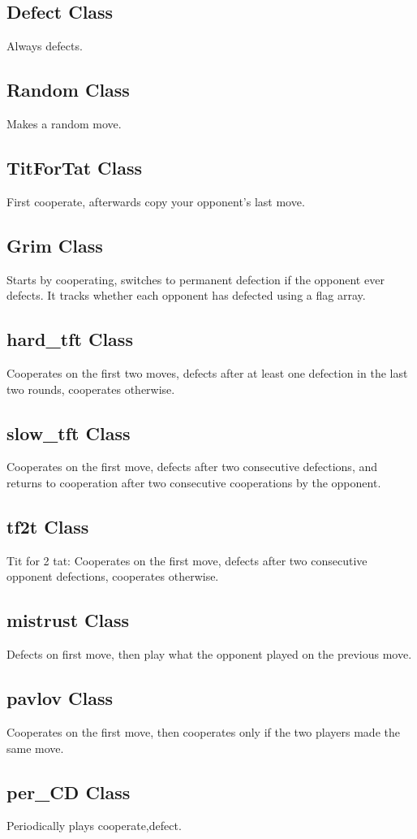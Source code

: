 \documentclass[12pt]{article}
\begin{document}
\subsection{Defect Class}
Always defects.
\subsection{Random Class}
Makes a random move.
\subsection{TitForTat Class}
First cooperate, afterwards copy your opponent's last move.
\subsection{Grim Class}
Starts by cooperating, switches to permanent defection if the opponent ever defects. It tracks whether each opponent has defected using a flag array.
\subsection{hard\_tft Class}
Cooperates on the first two moves, defects after at least one defection in the last two rounds,
cooperates otherwise.
\subsection{slow\_tft Class}
Cooperates on the first  move, defects after two consecutive defections,
and returns to cooperation after two consecutive cooperations by the opponent.
\subsection{tf2t Class}
Tit for 2 tat: Cooperates on the first move, defects after two consecutive opponent defections,
cooperates otherwise.
\subsection{mistrust Class}
Defects on first move, then play what the opponent played on the previous move.
\subsection{pavlov Class}
Cooperates on the first move, then cooperates only if the two players made the same move.
\subsection{per\_CD Class}
Periodically plays cooperate,defect.
\end{document}
